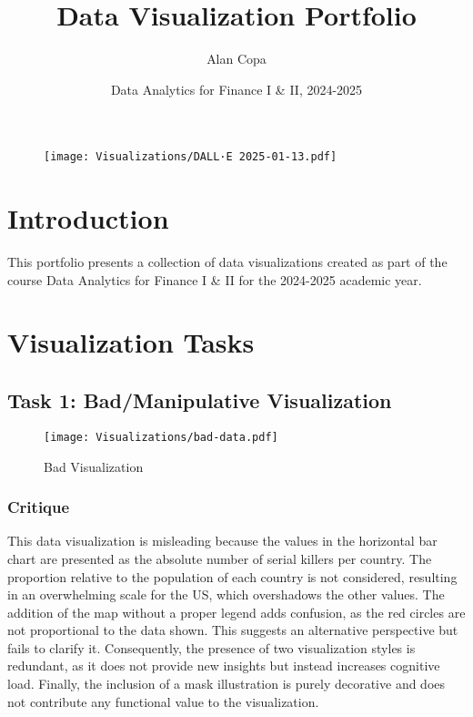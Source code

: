 \documentclass[a4paper,landscape]{article}
\title{Data Visualization Portfolio}
\author{Alan Copa}
\date{Data Analytics for Finance I \& II, 2024-2025}
\begin{document}
\maketitle
\begin{figure}[H]
    \centering
    \texttt{[image: Visualizations/DALL·E 2025-01-13.pdf]}
\end{figure}

\tableofcontents


\section{Introduction}
This portfolio presents a collection of data visualizations created as part of the course Data Analytics for Finance I \& II for the 2024-2025 academic year.

\section{Visualization Tasks}

\subsection{Task 1: Bad/Manipulative Visualization}
\begin{figure}[H]
    \centering
    \texttt{[image: Visualizations/bad-data.pdf]} %
    \caption{Bad Visualization \cite{worldatlas2025serialkillers}}
    \label{fig:bad}
\end{figure}

\subsubsection{Critique}
This data visualization is misleading because the values in the horizontal bar chart are presented as the absolute number of serial killers per country. The proportion relative to the population of each country is not considered, resulting in an overwhelming scale for the US, which overshadows the other values. The addition of the map without a proper legend adds confusion, as the red circles are not proportional to the data shown. This suggests an alternative perspective but fails to clarify it. Consequently, the presence of two visualization styles is redundant, as it does not provide new insights but instead increases cognitive load. Finally, the inclusion of a mask illustration is purely decorative and does not contribute any functional value to the visualization.
\end{document}
